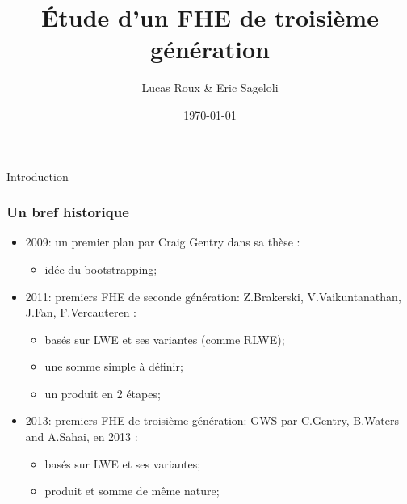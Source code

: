 \documentclass[10pt,xcolor={usenames,dvipsnames}]{beamer}
\title{\'Etude d'un FHE de troisième génération}
\date{\today}
\author{Lucas Roux \& Eric Sageloli}
\begin{document}
 \begin{frame} 
 \maketitle
 \end{frame}


\begin{section}{Introduction}

 \begin{frame} 
 \frametitle{Un bref historique}

\begin{itemize}
\item 2009: un premier plan par Craig Gentry dans sa thèse :
\begin{itemize}
\item idée du bootstrapping;
\end{itemize}
\item 2011: premiers FHE de seconde génération: Z.Brakerski, V.Vaikuntanathan, J.Fan, F.Vercauteren :
	\begin{itemize}
	\item basés sur LWE et ses variantes (comme RLWE);
	\item une somme simple à définir;
	\item un produit en 2 étapes;
	\end{itemize}
\item 2013: premiers FHE de troisième génération: GWS par C.Gentry, B.Waters and A.Sahai, en 2013 :
	\begin{itemize}
	\item basés sur LWE et ses variantes;
	\item produit et somme de même nature;
	\end{itemize}
\end{itemize}
\end{frame} 

\end{section}

\end{document}

